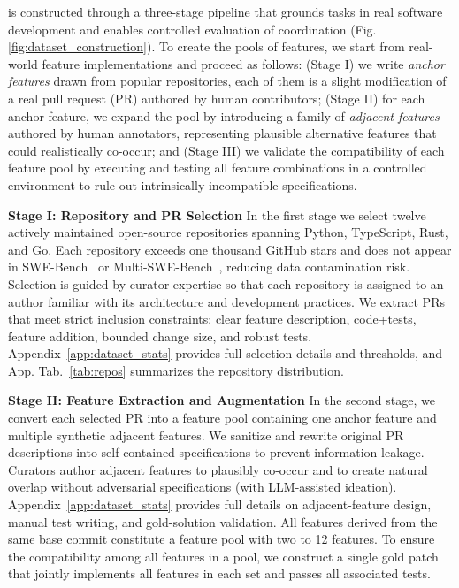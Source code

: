 \dataset is constructed through a three-stage pipeline that grounds tasks in real software development and enables controlled evaluation of coordination (Fig. \ref{fig:dataset_construction}). 
To create the pools of features, we start from real-world feature implementations and proceed as follows: 
(Stage I) we write \textit{anchor features} drawn from popular repositories, each of them is a slight modification of a real pull request (PR) authored by human contributors; 
(Stage II) for each anchor feature, we expand the pool by introducing a family of \textit{adjacent features} authored by human annotators, representing plausible alternative features that could realistically co-occur; and 
(Stage III) we validate the compatibility of each feature pool by executing and testing all feature combinations in a controlled environment to rule out intrinsically incompatible specifications. 


\noindent \textbf{Stage I: Repository and PR Selection} 
In the first stage we select twelve actively maintained open-source repositories spanning Python, TypeScript, Rust, and Go. 
Each repository exceeds one thousand GitHub stars and does not appear in SWE-Bench~\citep{jimenez2023swe} or Multi-SWE-Bench~\citep{zan2025multiswebench}, reducing data contamination risk. 
Selection is guided by curator expertise so that each repository is assigned to an author familiar with its architecture and development practices. 
We extract PRs that meet strict inclusion constraints: clear feature description, code+tests, feature addition, bounded change size, and robust tests. 
Appendix~\ref{app:dataset_stats} provides full selection details and thresholds, and App. Tab.~\ref{tab:repos} summarizes the repository distribution.



\noindent\textbf{Stage II: Feature Extraction and Augmentation}
In the second stage, we convert each selected PR into a feature pool containing one anchor feature and multiple synthetic adjacent features. 
We sanitize and rewrite original PR descriptions into self-contained specifications to prevent information leakage. 
Curators author adjacent features to plausibly co-occur and to create natural overlap without adversarial specifications (with LLM-assisted ideation). 
Appendix~\ref{app:dataset_stats} provides full details on adjacent-feature design, manual test writing, and gold-solution validation. All features derived from the same base commit constitute a feature pool with two to 12 features.
To ensure the compatibility among all features in a pool, we construct a single gold patch that jointly implements all features in each set and passes all associated tests. 


